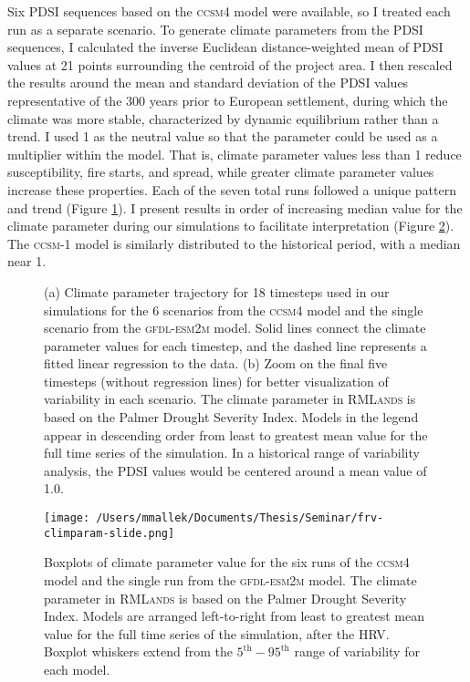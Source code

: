 Six PDSI sequences based on the \textsc{ccsm4} model were available, so I treated each run as a separate scenario. To generate climate parameters from the PDSI sequences, I calculated the inverse Euclidean distance-weighted mean of PDSI values at 21 points surrounding the centroid of the project area. I then rescaled the results around the mean and standard deviation of the PDSI values representative of the 300 years prior to European settlement, during which the climate was more stable, characterized by dynamic equilibrium rather than a trend. I used 1 as the neutral value so that the parameter could be used as a multiplier within the model. That is, climate parameter values less than 1 reduce susceptibility, fire starts, and spread, while greater climate parameter values increase these properties. Each of the seven total runs followed a unique pattern and trend (Figure \ref{fig:pdsi_future}). I present results in order of increasing median value for the climate parameter during our simulations to facilitate interpretation (Figure \ref{pdsi-boxplots}). The \textsc{ccsm-1} model is similarly distributed to the historical period, with a median near 1.


\begin{figure}[!htbp]
\centering
    \caption{(a) Climate parameter trajectory for 18 timesteps used in our simulations for the 6 scenarios from the \textsc{ccsm4} model and the single scenario from the \textsc{gfdl-esm2m} model. Solid lines connect the climate parameter values for each timestep, and the dashed line represents a fitted linear regression to the data. (b) Zoom on the final five timesteps (without regression lines) for better visualization of variability in each scenario. The climate parameter in \textsc{RMLands} is based on the Palmer Drought Severity Index. Models in the legend appear in descending order from least to greatest mean value for the full time series of the simulation. In a historical range of variability analysis, the PDSI values would be centered around a mean value of 1.0.}
\label{fig:pdsi_future}

\end{figure}

\begin{figure}[!htbp]
\centering
\texttt{[image: /Users/mmallek/Documents/Thesis/Seminar/frv-climparam-slide.png]}
\caption{Boxplots of climate parameter value for the six runs of the \textsc{ccsm4} model and the single run from the \textsc{gfdl-esm2m} model. The climate parameter in \textsc{RMLands} is based on the Palmer Drought Severity Index. Models are arranged left-to-right from least to greatest mean value for the full time series of the simulation, after the HRV. Boxplot whiskers extend from the $5^{\text{th}}-95^{\text{th}}$ range of variability for each model.}
\label{pdsi-boxplots}
\end{figure}


